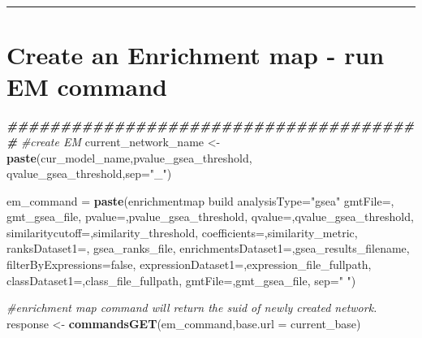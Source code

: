\documentclass[
]{book}
\newenvironment{Shaded}{\begin{snugshade}}{\end{snugshade}}
\newcommand{\AttributeTok}[1]{\textcolor[rgb]{0.13,0.29,0.53}{#1}}
\newcommand{\CommentTok}[1]{\textcolor[rgb]{0.56,0.35,0.01}{\textit{#1}}}
\newcommand{\DocumentationTok}[1]{\textcolor[rgb]{0.56,0.35,0.01}{\textbf{\textit{#1}}}}
\newcommand{\FunctionTok}[1]{\textcolor[rgb]{0.13,0.29,0.53}{\textbf{#1}}}
\newcommand{\NormalTok}[1]{#1}
\newcommand{\OtherTok}[1]{\textcolor[rgb]{0.56,0.35,0.01}{#1}}
\newcommand{\StringTok}[1]{\textcolor[rgb]{0.31,0.60,0.02}{#1}}
\begin{document}
\begin{center}\rule{0.5\linewidth}{0.5pt}\end{center}

\section{Create an Enrichment map - run EM command}\label{create-an-enrichment-map---run-em-command}

\begin{Shaded}
\begin{Highlighting}[]
\DocumentationTok{\#\#\#\#\#\#\#\#\#\#\#\#\#\#\#\#\#\#\#\#\#\#\#\#\#\#\#\#\#\#\#\#\#\#\#\#\#\#\#}
\CommentTok{\#create EM}
\NormalTok{current\_network\_name }\OtherTok{\textless{}{-}} \FunctionTok{paste}\NormalTok{(cur\_model\_name,pvalue\_gsea\_threshold,}
\NormalTok{                              qvalue\_gsea\_threshold,}\AttributeTok{sep=}\StringTok{"\_"}\NormalTok{)}

\NormalTok{em\_command }\OtherTok{=} \FunctionTok{paste}\NormalTok{(}\StringTok{\textquotesingle{}enrichmentmap build analysisType="gsea" gmtFile=\textquotesingle{}}\NormalTok{,}
\NormalTok{                                                              gmt\_gsea\_file,}
                   \StringTok{\textquotesingle{}pvalue=\textquotesingle{}}\NormalTok{,pvalue\_gsea\_threshold, }
                   \StringTok{\textquotesingle{}qvalue=\textquotesingle{}}\NormalTok{,qvalue\_gsea\_threshold,}
                   \StringTok{\textquotesingle{}similaritycutoff=\textquotesingle{}}\NormalTok{,similarity\_threshold,}
                   \StringTok{\textquotesingle{}coefficients=\textquotesingle{}}\NormalTok{,similarity\_metric,}
                   \StringTok{\textquotesingle{}ranksDataset1=\textquotesingle{}}\NormalTok{, gsea\_ranks\_file,}
                   \StringTok{\textquotesingle{}enrichmentsDataset1=\textquotesingle{}}\NormalTok{,gsea\_results\_filename, }
                   \StringTok{\textquotesingle{}filterByExpressions=false\textquotesingle{}}\NormalTok{,}
                   \StringTok{\textquotesingle{}expressionDataset1=\textquotesingle{}}\NormalTok{,expression\_file\_fullpath,}
                   \StringTok{\textquotesingle{}classDataset1=\textquotesingle{}}\NormalTok{,class\_file\_fullpath,}
                   \StringTok{\textquotesingle{}gmtFile=\textquotesingle{}}\NormalTok{,gmt\_gsea\_file,}
                   \AttributeTok{sep=}\StringTok{" "}\NormalTok{)}

\CommentTok{\#enrichment map command will return the suid of newly created network.}
\NormalTok{response }\OtherTok{\textless{}{-}} \FunctionTok{commandsGET}\NormalTok{(em\_command,}\AttributeTok{base.url =}\NormalTok{ current\_base)}


\end{Highlighting}
\end{Shaded}
\end{document}

